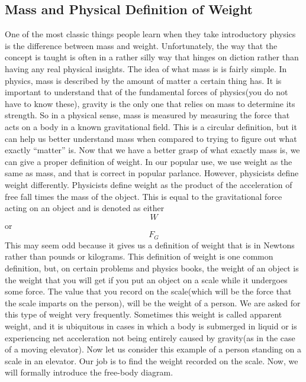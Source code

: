 \documentclass{article}[gray]
\numberwithin{equation}{subsection}
\begin{document}
\subsection{Mass and Physical Definition of Weight}

One of the most classic things people learn when they take introductory physics is the difference between mass and weight. Unfortunately, the way that the concept is taught is often in a rather silly way that hinges on diction rather than having any real physical insights. The idea of what mass is is fairly simple. In physics, mass is described by the amount of matter a certain thing has. It is important to understand that of the fundamental forces of physics(you do not have to know these), gravity is the only one that relies on mass to determine its strength. So in a physical sense, mass is measured by measuring the force that acts on a body in a known gravitational field. This is a circular definition, but it can help us better understand mass when compared to trying to figure out what exactly “matter” is. Now that we have a better grasp of what exactly mass is, we can give a proper definition of weight. In our popular use, we use weight as the same as mass, and that is correct in popular parlance. However, physicists define weight differently. Physicists define weight as the product of the acceleration of free fall times the mass of the object. This is equal to the gravitational force acting on an object and is denoted as either $$W$$ or $$F_G$$ This may seem odd because it gives us a definition of weight that is in Newtons rather than pounds or kilograms. This definition of weight is one common definition, but, on certain problems and  physics books, the weight of an object is the weight that you will get if you put an object on a scale while it undergoes some force. The value that you record on the scale(which will be the force that the scale imparts on the person), will be the weight of a person. We are asked for this type of weight very frequently. Sometimes this weight is called apparent weight, and it is ubiquitous in cases in which a body is submerged in liquid or is experiencing net acceleration not being entirely caused by gravity(as in the case of a moving elevator). Now let us consider this example of a person standing on a scale in an elevator. Our job is to find the weight recorded on the scale. Now, we will formally introduce the free-body diagram. 
\end{document}
